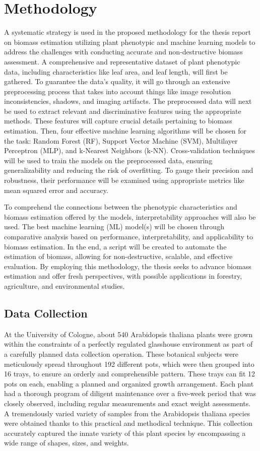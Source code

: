 \documentclass[a4paper,11pt]{report}%
\renewcommand{\\}{\vspace*{0.5\baselineskip} \newline}
\begin{document}
\chapter{Methodology}
A systematic strategy is used in the proposed methodology for the thesis report on biomass estimation utilizing plant phenotypic and machine learning models to address the challenges with conducting accurate and non-destructive biomass assessment. A comprehensive and representative dataset of plant phenotypic data, including characteristics like leaf area, and leaf length, will first be gathered. To guarantee the data's quality, it will go through an extensive preprocessing process that takes into account things like image resolution inconsistencies, shadows, and imaging artifacts. The preprocessed data will next be used to extract relevant and discriminative features using the appropriate methods. These features will capture crucial details pertaining to biomass estimation. Then, four effective machine learning algorithms will be chosen for the task: Random Forest (RF), Support Vector Machine (SVM), Multilayer Perceptron (MLP), and k-Nearest Neighbors (k-NN). Cross-validation techniques will be used to train the models on the preprocessed data, ensuring generalizability and reducing the risk of overfitting. To gauge their precision and robustness, their performance will be examined using appropriate metrics like mean squared error and accuracy.

\noindent To comprehend the connections between the phenotypic characteristics and biomass estimation offered by the models, interpretability approaches will also be used. The best machine learning (ML) model(s) will be chosen through comparative analysis based on performance, interpretability, and applicability to biomass estimation. In the end, a script will be created to automate the estimation of biomass, allowing for non-destructive, scalable, and effective evaluation. By employing this methodology, the thesis seeks to advance biomass estimation and offer fresh perspectives, with possible applications in forestry, agriculture, and environmental studies.

\section{Data Collection}
At the University of Cologne, about 540 Arabidopsis thaliana plants were grown within the constraints of a perfectly regulated glasshouse environment as part of a carefully planned data collection operation. These botanical subjects were meticulously spread throughout 192 different pots, which were then grouped into 16 trays, to ensure an orderly and comprehensible pattern. These trays can fit 12 pots on each, enabling a planned and organized growth arrangement.
Each plant had a thorough program of diligent maintenance over a five-week period that was closely observed, including regular measurements and exact weight assessments. A tremendously varied variety of samples from the Arabidopsis thaliana species were obtained thanks to this practical and methodical technique. This collection accurately captured the innate variety of this plant species by encompassing a wide range of shapes, sizes, and weights.
\end{document}
